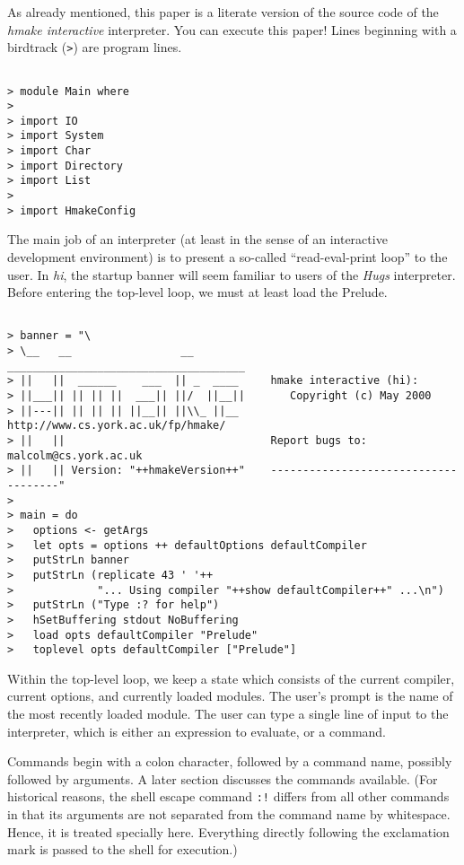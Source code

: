 \documentclass[a4paper]{article}
\begin{document}
As already mentioned, this paper is a literate version of the
source code of the {\em hmake interactive} interpreter.  You can
execute this paper!  Lines beginning with a birdtrack ({\tt >})
are program lines.

\begin{verbatim}

> module Main where
> 
> import IO
> import System
> import Char
> import Directory
> import List
> 
> import HmakeConfig

\end{verbatim}

The main job of an interpreter (at least in the sense of an interactive
development environment) is to present a so-called ``read-eval-print
loop'' to the user.  In {\em hi}, the startup banner will seem familiar
to users of the {\em Hugs} interpreter.  Before entering the top-level
loop, we must at least load the Prelude.

\begin{verbatim}

> banner = "\ 
> \__   __                 __             _____________________________________
> ||   ||  ______    ___  || _  ____     hmake interactive (hi):
> ||___|| || || ||  ___|| ||/  ||__||       Copyright (c) May 2000
> ||---|| || || || ||__|| ||\\_ ||__         http://www.cs.york.ac.uk/fp/hmake/
> ||   ||                                Report bugs to: malcolm@cs.york.ac.uk
> ||   || Version: "++hmakeVersion++"    -------------------------------------"
>
> main = do
>   options <- getArgs
>   let opts = options ++ defaultOptions defaultCompiler
>   putStrLn banner
>   putStrLn (replicate 43 ' '++
>             "... Using compiler "++show defaultCompiler++" ...\n")
>   putStrLn ("Type :? for help")
>   hSetBuffering stdout NoBuffering
>   load opts defaultCompiler "Prelude"
>   toplevel opts defaultCompiler ["Prelude"]

\end{verbatim}

Within the top-level loop, we keep a state which consists of the
current compiler, current options, and currently loaded modules.
The user's prompt is the name of the most recently loaded module.
The user can type a single line of input to the interpreter, which
is either an expression to evaluate, or a command.

Commands begin with a colon character, followed by a command name,
possibly followed by arguments.  A later section discusses the commands
available.  (For historical reasons, the shell escape command {\tt :!}
differs from all other commands in that its arguments are not separated
from the command name by whitespace.  Hence, it is treated specially
here.  Everything directly following the exclamation mark is passed
to the shell for execution.)
\end{document}
